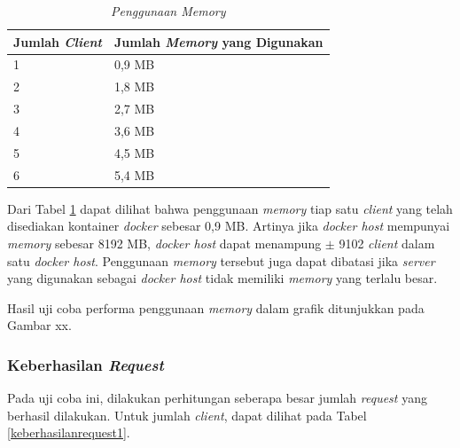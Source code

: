 \begin{longtable}{|p{}|p{}|}
	\caption{\textit{Penggunaan \textit{Memory}}} \label{penggunaanmemory1} \\
	\hline
	\textbf{Jumlah \textit{Client}} & \textbf{Jumlah \textit{Memory} yang Digunakan} \\ \hline
	\endfirsthead

	\endhead
	\endfoot
	\endlastfoot
	
	1 & 0,9 MB \\ \hline
	2 & 1,8 MB \\ \hline
	3 & 2,7 MB \\ \hline
	4 & 3,6 MB \\ \hline
	5 & 4,5 MB \\ \hline
	6 & 5,4 MB \\ \hline
\end{longtable}
Dari Tabel \ref{penggunaanmemory1} dapat dilihat bahwa penggunaan \textit{memory} tiap satu \textit{client} yang telah disediakan kontainer \textit{docker} sebesar 0,9 MB. Artinya jika \textit{docker host} mempunyai \textit{memory} sebesar 8192 MB, \textit{docker host} dapat menampung $\pm$ 9102 \textit{client} dalam satu \textit{docker host}. Penggunaan \textit{memory} tersebut juga dapat dibatasi jika \textit{server} yang digunakan sebagai \textit{docker host} tidak memiliki \textit{memory} yang terlalu besar.

Hasil uji coba performa penggunaan \textit{memory} dalam grafik ditunjukkan pada Gambar xx.

\subsubsection{Keberhasilan \textit{Request}}
Pada uji coba ini, dilakukan perhitungan seberapa besar jumlah \textit{request} yang berhasil dilakukan. Untuk jumlah \textit{client}, dapat dilihat pada Tabel \ref{keberhasilanrequest1}.

